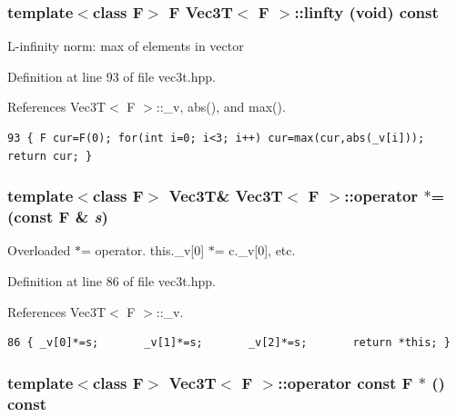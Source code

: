 \subsubsection{\setlength{\rightskip}{0pt plus 5cm}template$<$class F$>$ F {\bf Vec3T}$<$ F $>$::linfty (void) const\hspace{0.3cm}{\tt  [inline]}}\label{classVec3T_c7a97570bd6556e3c5b1880cdd762fe7_c7a97570bd6556e3c5b1880cdd762fe7}


L-infinity norm: max of elements in vector 

Definition at line 93 of file vec3t.hpp.

References Vec3T$<$ F $>$::\_\-v, abs(), and max().

\footnotesize\begin{verbatim}93 { F cur=F(0); for(int i=0; i<3; i++) cur=max(cur,abs(_v[i])); return cur; }
\end{verbatim}\normalsize 


\subsubsection{\setlength{\rightskip}{0pt plus 5cm}template$<$class F$>$ {\bf Vec3T}\& {\bf Vec3T}$<$ F $>$::operator $\ast$= (const F \& {\em s})\hspace{0.3cm}{\tt  [inline]}}\label{classVec3T_404673cf6ccdc8cbaa386ee62bda9ee3_404673cf6ccdc8cbaa386ee62bda9ee3}


Overloaded $\ast$= operator. this.\_\-v[0] $\ast$= c.\_\-v[0], etc. 

Definition at line 86 of file vec3t.hpp.

References Vec3T$<$ F $>$::\_\-v.

\footnotesize\begin{verbatim}86 { _v[0]*=s;       _v[1]*=s;       _v[2]*=s;       return *this; }
\end{verbatim}\normalsize 


\subsubsection{\setlength{\rightskip}{0pt plus 5cm}template$<$class F$>$ {\bf Vec3T}$<$ F $>$::operator const F $\ast$ () const\hspace{0.3cm}{\tt  [inline]}}\label{classVec3T_fa3f101185e97bac2b0f08d3588ae2f4_fa3f101185e97bac2b0f08d3588ae2f4}


